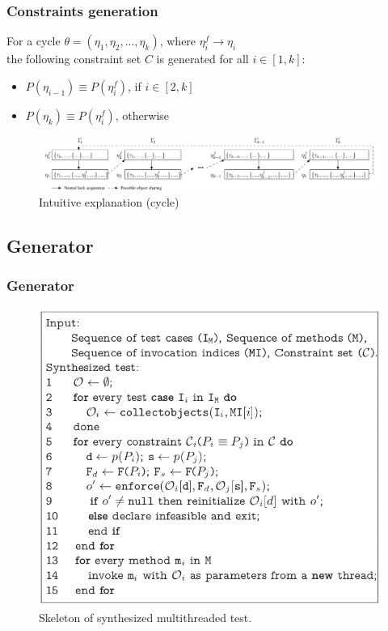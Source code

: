 \documentclass{beamer}
\begin{document}
\begin{frame}
\frametitle{Constraints generation}
 For a cycle $\theta = (\eta_1, \eta_2,..., \eta_k )$, where $\eta_i^f \to \eta_i$\\
 the following constraint set $C$ is generated for all $i \in [1,k]$:\\
 \begin{itemize}
  \item $P(\eta_{i-1}) \equiv P(\eta_i^f)$, if $i \in [2,k]$
  \item $P(\eta_k) \equiv P(\eta_i^f)$, otherwise
 \end{itemize}
 \begin{figure}[ht!]
     
  \includegraphics[scale = 0.3]{Images/cycle.png}
       
  \caption{%
        Intuitive explanation (cycle)
  }%
\end{figure}
\end{frame}

\subsection{Generator}
\begin{frame}
\frametitle{Generator}
\begin{figure}[ht!]
     
           \includegraphics[scale = 0.3]{Images/skel.png}
       
    \caption{%
        Skeleton of synthesized multithreaded test.
     }%
   \label{fig:subfigures}
\end{figure}
\end{frame}
\end{document}

